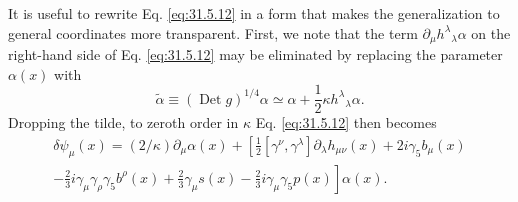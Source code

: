 It is useful to rewrite Eq. \eqref{eq:31.5.12} in a form that makes the
generalization to general coordinates more transparent. First, we note
that the term \(\partial_\mu h^\lambda{}_\lambda\alpha\) on the
right-hand side of Eq. \eqref{eq:31.5.12} may be eliminated by replacing
the parameter \(\alpha(x)\) with
\begin{equation}
  \widetilde\alpha
  \equiv(\operatorname{Det}g)^{1/4}\alpha
  \simeq\alpha+\frac{1}{2}\kappa h^\lambda{}_\lambda\alpha.
  \tag{31.5.13}\label{eq:31.5.13}
\end{equation}
Dropping the tilde, to zeroth order in \(\kappa\) Eq. \eqref{eq:31.5.12}
then becomes
\begin{multline}
  \delta\psi_\mu(x)
  =(2/\kappa)\partial_\mu\alpha(x)
  +\left[
      \frac{1}{2}[\gamma^\nu,\gamma^\lambda]
        \partial_\lambda h_{\mu\nu}(x)
      +2i\gamma_5b_\mu(x)\right.\\
  \left.
      -\frac{2}{3}i\gamma_\mu\gamma_\rho\gamma_5b^\rho(x)
      +\frac{2}{3}\gamma_\mu s(x)
      -\frac{2}{3}i\gamma_\mu\gamma_5p(x)
    \right]\alpha(x).
  \tag{31.5.14}\label{eq:31.5.14}
\end{multline}

